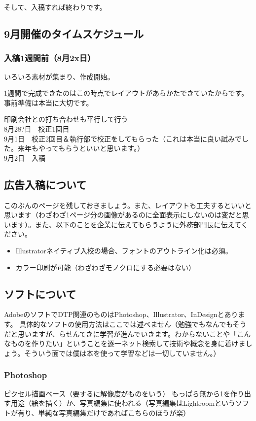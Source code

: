 \documentclass[dvipdfmx,jb5]{jarticle}
\begin{document}
そして、入稿すれば終わりです。

\subsection{9月開催のタイムスケジュール}
\subsubsection{入稿1週間前（8月2x日）}
いろいろ素材が集まり、作成開始。

1週間で完成できたのはこの時点でレイアウトがあらかたできていたからです。事前準備は本当に大切です。

印刷会社との打ち合わせも平行して行う\\
8月28?日　校正1回目\\
9月1日　校正2回目＆執行部で校正をしてもらった（これは本当に良い試みでした。来年もやってもらうといいと思います。）\\
9月2日　入稿\\

\subsection{広告入稿について}
このぶんのページを残しておきましょう。また、レイアウトも工夫するといいと思います（わざわざ1ページ分の画像があるのに全面表示にしないのは変だと思います）。また、以下のことを企業に伝えてもらうように外務部門長に伝えてください。
\begin{itemize}
  \item Illustratorネイティブ入校の場合、フォントのアウトライン化は必須。
  \item カラー印刷が可能（わざわざモノクロにする必要はない）
\end{itemize}

\subsection{ソフトについて}
AdobeのソフトでDTP関連のものはPhotoshop、Illustrator、InDesignとあります。
具体的なソフトの使用方法はここでは述べません（勉強でもなんでもそうだと思いますが、らせんてきに学習が進んでいきます。わからないことや「こんなものを作りたい」ということを逐一ネット検索して技術や概念を身に着けましょう。そういう面では僕は本を使って学習などは一切していません。）

\subsubsection{Photoshop}
ピクセル描画ベース（要するに解像度がものをいう）
もっぱら無から1を作り出す用途（絵を描く）か、写真編集に使われる（写真編集はLightroomというソフトが有り、単純な写真編集だけであればこちらのほうが楽）
\end{document}
